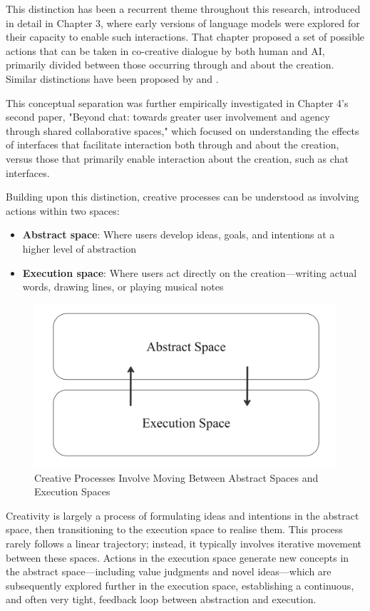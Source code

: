 This distinction has been a recurrent theme throughout this research, introduced in detail in Chapter 3, where early versions of language models were explored for their capacity to enable such interactions. That chapter proposed a set of possible actions that can be taken in co-creative dialogue by both human and AI, primarily divided between those occurring through and about the creation. Similar distinctions have been proposed by \cite{rezwana} and \cite{kellas}.

This conceptual separation was further empirically investigated in Chapter 4's second paper, "Beyond chat: towards greater user involvement and agency through shared collaborative spaces," which focused on understanding the effects of interfaces that facilitate interaction both through and about the creation, versus those that primarily enable interaction about the creation, such as chat interfaces.

Building upon this distinction, creative processes can be understood as involving actions within two spaces:
\begin{itemize}
\item \textbf{Abstract space}: Where users develop ideas, goals, and intentions at a higher level of abstraction
\item \textbf{Execution space}: Where users act directly on the creation—writing actual words, drawing lines, or playing musical notes
\end{itemize}
\begin{figure}
\centering
\includegraphics[width=1\linewidth]{twospaces.png}
\caption{Creative Processes Involve Moving Between Abstract Spaces and Execution Spaces}
\label{fig:enter-label}
\end{figure}

Creativity is largely a process of formulating ideas and intentions in the abstract space, then transitioning to the execution space to realise them. This process rarely follows a linear trajectory; instead, it typically involves iterative movement between these spaces. Actions in the execution space generate new concepts in the abstract space—including value judgments and novel ideas—which are subsequently explored further in the execution space, establishing a continuous, and often very tight, feedback loop between abstraction and execution.


